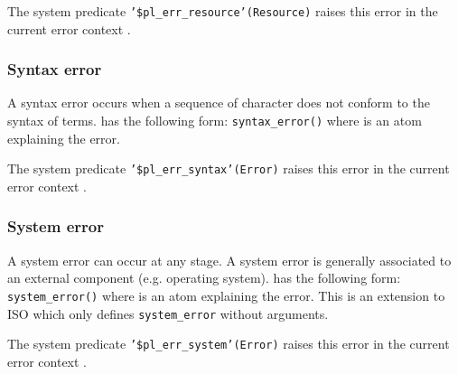 The system predicate \texttt{'\$pl\_err\_resource'(Resource)} raises this
error in the current error context .

\subsubsection{Syntax error}
\label{Syntax-error}
A syntax error occurs when a sequence of character does not conform to the
syntax of terms.  has the following form:
\texttt{syntax\_error()} where  is an
atom explaining the error.

The system predicate \texttt{'\$pl\_err\_syntax'(Error)} raises this
error in the current error context .

\subsubsection{System error}
A system error can occur at any stage. A system error is generally
associated to an external component (e.g. operating system).
 has the following form:
\texttt{system\_error()} where  is an
atom explaining the error. This is an extension to ISO which only defines
\texttt{system\_error} without arguments.

The system predicate \texttt{'\$pl\_err\_system'(Error)} raises this
error in the current error context .

